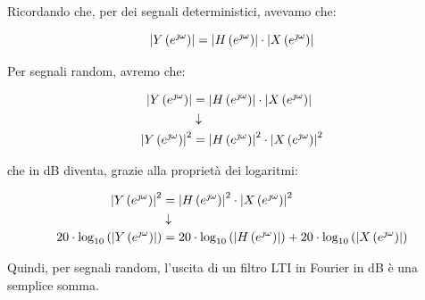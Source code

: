 \newpage 

Ricordando che, per dei segnali deterministici, avevamo che: 

{
    \Large 
    \begin{equation}
            \abs{Y \left(e^{\jmath \omega}\right)}
            = 
            \abs{H \left(e^{\jmath \omega}\right)}
            \cdot 
            \abs{X \left(e^{\jmath \omega}\right)}
    \end{equation}
}

Per segnali random, avremo che: 

{
    \Large 
    \begin{equation}
        \begin{split}
            \abs{Y \left(e^{\jmath \omega}\right)}
            &= 
            \abs{H \left(e^{\jmath \omega}\right)}
            \cdot 
            \abs{X \left(e^{\jmath \omega}\right)}
            \\
            &\downarrow
            \\
            \abs{Y \left(e^{\jmath \omega}\right)}^{2}
            &= 
            \abs{H \left(e^{\jmath \omega}\right)}^{2}
            \cdot 
            \abs{X \left(e^{\jmath \omega}\right)}^{2}
        \end{split}
    \end{equation}
}

che in dB diventa, grazie alla proprietà dei logaritmi: 

{
    \Large 
    \begin{equation}
        \begin{split}
            \abs{Y \left(e^{\jmath \omega}\right)}^{2}
            &= 
            \abs{H \left(e^{\jmath \omega}\right)}^{2}
            \cdot 
            \abs{X \left(e^{\jmath \omega}\right)}^{2}
            \\
            &\downarrow
            \\
            20 \cdot \log_{10} \left( \abs{Y \left( e^{\jmath \omega}\right)}\right)
            &=
            20 \cdot \log_{10} \left( \abs{H \left( e^{\jmath \omega}\right)}\right)
            +
            20 \cdot \log_{10} \left( \abs{X \left( e^{\jmath \omega}\right)}\right)
        \end{split}
    \end{equation}
}

Quindi, per segnali random, l'uscita di un filtro LTI in Fourier in dB è una semplice somma. \newline 

